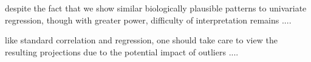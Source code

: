 \documentclass{llncs}
\begin{document}
despite the fact that we show similar biologically plausible patterns to univariate
regression, though with greater power, 
difficulty of interpretation remains ....  

like standard correlation and regression, one should take care to view the resulting
projections due to the potential impact of outliers .... 





\end{document}
